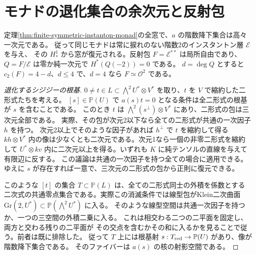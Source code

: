 \section{モナドの退化集合の余次元と反射包}
\label{sec:finite-instanton-sheaf-boundary}
\begin{theorem}\label{thm:finite-instanton-sheaf-boundary}
定理\ref{thm:finite-symmetric-instanton-monad}の全窓で、$a$ の階数降下集合は高々一次元である。
従って同じモナドは常に捩れのない階数2のインスタントン層 $\mathcal E$ を与え、
その $H^1_*$ から窓が復元される。反射包 $F=\mathcal E^{**}$ は局所自由であり、
$Q=F/\mathcal E$ は零か純一次元で $H^*(Q(-2))=0$ である。
$d=\deg Q$ とすると $c_2(F)=4-d$、$d\le4$ で、$d=4$ なら $F\simeq\mathcal O^2$ である。
\end{theorem}
\begin{proof}[退化するシジジーの根基]
$0\ne t\in L\subset\bigwedge^2 U^*\otimes V^*$ を取り、$t$ を $V$ で縮約した二形式たちを考える。
$[s]\in\mathbb P(U)$ で $a(s)t=0$ となる条件は全二形式の根基が $s$ を含むことである。
このとき $t$ は $\bigwedge^2(s^\perp)\otimes V^*$ にあり、二形式の包は三次元全部である。
実際、その包が次元2以下なら全ての二形式が共通の一次因子 $h$ を持つ。
次元2以上でそのような因子があれば $h^\perp$ で $t$ を縮約して得る
$kh\otimes V^*$ 内の像は少なくとも二次元である。次元1なら一個の非零二形式を縮約して
$U^*\otimes kv$ 内に二次元以上を得る。いずれも $K$ に純テンソルの直線を与えて有限辺に反する。
この議論は共通の一次因子を持つ全ての場合に適用できる。
ゆえに $s$ が存在すれば一意で、三次元の二形式の包から正則に復元できる。

このような $[t]$ の集合 $T\subset\mathbb P(L)$ は、全ての二形式同士の外積を係数とする
二次式の共通零点集合である。実際この消滅条件では線型包がKlein二次曲面
$\mathrm{Gr}(2,U^*)\subset\mathbb P(\bigwedge^2 U^*)$ に入る。
そのような線型空間は共通一次因子を持つか、一つの三空間の外積二乗に入る。
これは相交わる二つの二平面を固定し、両方と交わる残りの二平面が
その交点を含むかその和に入るかを見ることで従う。前者は既に排除した。
従って $T$ 上には根基射 $s:T_{\rm red}\to\mathbb P(U)$ があり、像が階数降下集合である。
そのファイバーは $a(s)$ の核の射影空間である。


\end{proof}
